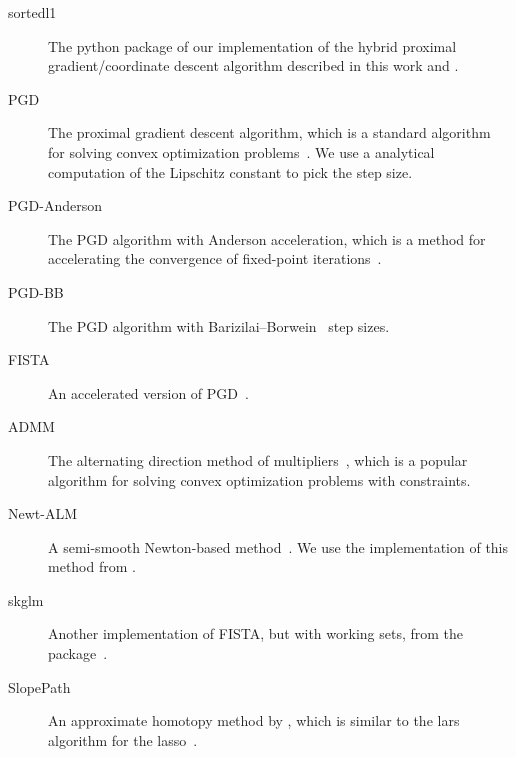 \documentclass[article]{jss}
\begin{document}
\begin{description}
  \item[sortedl1] The python package of our implementation of the hybrid
        proximal gradient/coordinate descent algorithm described in this work and
        \citet{larsson2023}.
  \item[PGD] The proximal gradient descent algorithm, which is a standard
        algorithm for solving convex optimization problems~\citep{wright2009}. We use a
        analytical computation of the Lipschitz constant to pick the step size.
  \item[PGD-Anderson] The PGD algorithm with Anderson acceleration, which is a
        method for accelerating the convergence of fixed-point
        iterations~\citep{anderson1965,zhang2020}.
  \item[PGD-BB] The PGD algorithm with Barizilai--Borwein~\citep{barzilai1988} step sizes.
  \item[FISTA] An accelerated version of PGD~\citep{beck2009}.
  \item[ADMM] The alternating direction method of
        multipliers~\citep{glowinski1975,boyd2010}, which is a popular algorithm
        for solving convex optimization problems with constraints.
  \item[Newt-ALM] A semi-smooth Newton-based method~\citep{luo2019}. We use the
        implementation of this method from \citet{larsson2023}.
  \item[skglm] Another implementation of FISTA, but with working sets, from the
         package~\citep{bertrand2022}.
  \item[SlopePath] An approximate homotopy method by \citet{dupuis2024},
        which is similar to the lars algorithm for the lasso~\citep{efron2004}.
\end{description}



\newpage

\begin{appendix}

\end{appendix}
\end{document}
